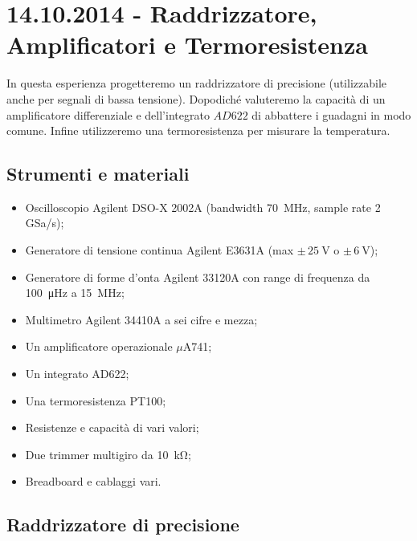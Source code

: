 \section{14.10.2014 - Raddrizzatore, Amplificatori e Termoresistenza}

In questa esperienza progetteremo un raddrizzatore di precisione (utilizzabile anche per segnali di bassa tensione). Dopodiché valuteremo la capacità di un amplificatore differenziale e dell'integrato $AD622$ di abbattere i guadagni in modo comune. Infine utilizzeremo una termoresistenza per misurare la temperatura.

\subsection*{Strumenti e materiali}

\begin{itemize} [noitemsep]
\item Oscilloscopio Agilent DSO-X 2002A (bandwidth \SI{70}{\mega\hertz}, sample rate \num{2} GSa/s);
\item Generatore di tensione continua Agilent E3631A (max $\pm \, \SI{25}{\volt}$ o $\pm \, \SI{6}{\volt}$);
\item Generatore di forme d'onta Agilent 33120A con range di frequenza da \SI{100}{\micro\hertz} a \SI{15}{\mega\hertz};
\item Multimetro Agilent 34410A a sei cifre e mezza;
\item Un amplificatore operazionale $\mu$A741;
\item Un integrato AD622;
\item Una termoresistenza PT100;
\item Resistenze e capacità di vari valori;
\item Due trimmer multigiro da \SI{10}{\kilo\ohm};
\item Breadboard e cablaggi vari.
\end{itemize}

\subsection{Raddrizzatore di precisione}



